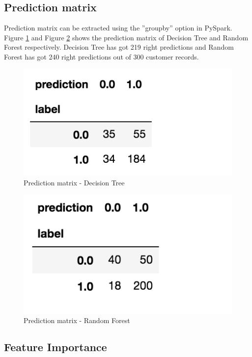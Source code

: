\documentclass[sigconf]{acmart}
\begin{document}
\subsection{Prediction matrix} 

Prediction matrix can be extracted using the ''groupby'' option in PySpark. Figure \ref{fig:Figure20} and Figure \ref{fig:Figure21} shows the prediction matrix of Decision Tree and Random Forest respectively. Decision Tree has got 219 right predictions and Random Forest has got 240 right predictions out of 300 customer records.

\begin{figure}[htb]
  \centering
  \includegraphics[width=1.0\columnwidth]{images/Figure20.png}
  \caption{Prediction matrix - Decision Tree}
  \label{fig:Figure20} 
\end{figure}

\begin{figure}[htb]
  \centering
  \includegraphics[width=1.0\columnwidth]{images/Figure21.png}
  \caption{Prediction matrix - Random Forest}
  \label{fig:Figure21} 
\end{figure}

\subsection{Feature Importance} 
\end{document}
